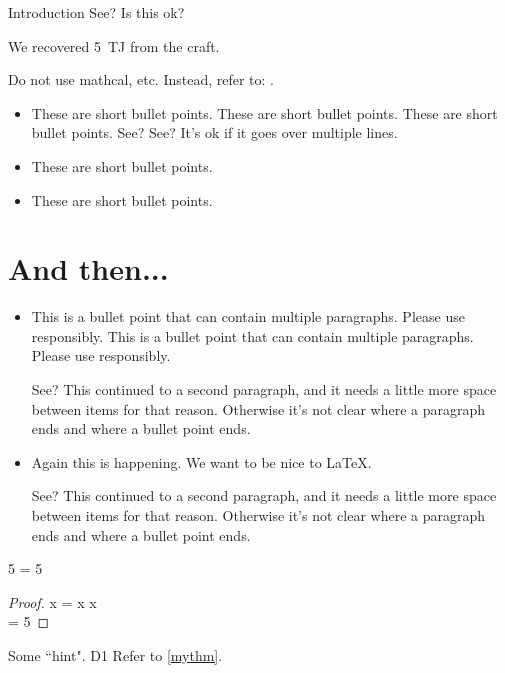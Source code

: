 \begin{MainChapter}{Introduction}
See? Is this ok?


We recovered \qty{5}{\tera\joule} from the craft.

Do not use mathcal, etc. Instead, refer to: .

\begin{itemize}
    \item These are short bullet points. These are short bullet points. These are short bullet points. See? See? It's ok if it goes over multiple lines.
    \item These are short bullet points.
    \item These are short bullet points.
\end{itemize}

\newpage
\section{And then...}

\begin{itemize}[long]
    \item
    This is a bullet point that can contain multiple paragraphs. Please use responsibly.
    This is a bullet point that can contain multiple paragraphs. Please use responsibly.
    
    See? This continued to a second paragraph, and it needs a little more space between items for that reason. Otherwise it's not clear where a paragraph ends and where a bullet point ends.
    
    \item Again this is happening. We want to be nice to LaTeX.
    
    See? This continued to a second paragraph, and it needs a little more space between items for that reason. Otherwise it's not clear where a paragraph ends and where a bullet point ends.
\end{itemize}

\begin{Theorem}[label=mythm, name=Fiveness]
5 = 5
\end{Theorem}

\begin{proof}
x = x \forall x\\
 = 5
\end{proof}

\begin{Hint}[name = An optional title., label=fives]
Some ``hint". \ac{D1}
Refer to \cref{mythm}.
\end{Hint}


\end{MainChapter}
